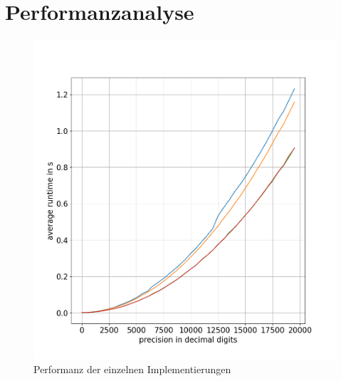 \documentclass[course=erap]{aspdoc}
\begin{document}
\section{Performanzanalyse} \label{sec:performanz}
\begin{figure}[h] \centering
  \includegraphics[scale=0.4]{graphiken/performanz-diagramm.jpg}
  \caption{Performanz der einzelnen Implementierungen} \label{img:performanz-diagramm}
\end{figure} 
\end{document}
